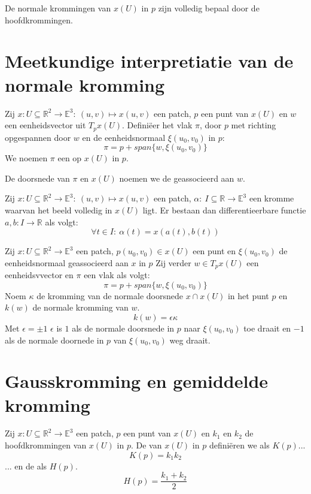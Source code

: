 \documentclass[main.tex]{subfiles}
\begin{document}
\begin{lem}
  De normale krommingen van $x(U)$ in $p$ zijn volledig bepaal door de hoofdkrommingen.
\end{lem}

\section{Meetkundige interpretiatie van de normale kromming}
\label{sec:meetk-interpr-van}

\begin{de}
  Zij $x: U \subseteq \mathbb{R}^{2} \rightarrow \mathbb{E}^{3}:\ (u,v) \mapsto x(u,v)$ een patch, $p$ een punt van $x(U)$ en $w$ een eenheidsvector uit $T_{p}x(U)$.
  Defini\"eer het vlak $\pi$, door $p$ met richting opgespannen door $w$ en de eenheidsnormaal $\xi(u_{0},v_{0})$ in $p$:
  \[ \pi = p + span\{ w, \xi(u_{0},v_{0})\} \]
  We noemen $\pi$ een  op $x(U)$ in $p$.
\end{de}

\begin{de}
  De doorsnede van $\pi$ en $x(U)$ noemen we de  geassocieerd aan $w$.
\end{de}

\begin{lem}
  Zij $x: U \subseteq \mathbb{R}^{2} \rightarrow \mathbb{E}^{3}:\ (u,v) \mapsto x(u,v)$ een patch, $\alpha:\ I \subseteq \mathbb{R} \rightarrow \mathbb{E}^{3}$ een kromme waarvan het beeld volledig in $x(U)$ ligt.
  Er bestaan dan differentieerbare functie $a,b: I \rightarrow \mathbb{R}$ als volgt:
  \[ \forall t\in I:\ \alpha(t) = x(a(t),b(t))\]
\end{lem}

\begin{st}
  Zij $x: U \subseteq \mathbb{R}^{2} \rightarrow \mathbb{E}^{3}$ een patch, $p(u_{0},v_{0})\in x(U)$ een punt en $\xi(u_{0},v_{0})$ de eenheidsnormaal geassocieerd aan $x$ in $p$
  Zij verder $w\in T_{p}x(U)$ een eenheidsvvector en $\pi$ een vlak als volgt:
  \[ \pi = p + span\{ w, \xi(u_{0},v_{0})\} \]
  Noem $\kappa$ de kromming van de normale doorsnede $x\cap x(U)$ in het punt $p$ en $k(w)$ de normale kromming van $w$.
  \[ k(w) = \epsilon \kappa \]
  Met $\epsilon = \pm 1$
  $\epsilon$ is $1$ als de normale doorsnede in $p$ naar $\xi(u_{0},v_{0})$ toe draait en $-1$ als de normale doornede in $p$ van $\xi(u_{0},v_{0})$ weg draait.
\end{st}

\section{Gausskromming en gemiddelde kromming}
\label{sec:gausskr-en-gemidd}

\begin{de}
  Zij $x: U \subseteq \mathbb{R}^{2} \rightarrow \mathbb{E}^{3}$ een patch, $p$ een punt van $x(U)$ en $k_{1}$ en $k_{2}$ de hoofdkrommingen van $x(U)$ in $p$.
  De  van $x(U)$ in $p$ defini\"eren we als $K(p)$...
  \[ K(p) = k_{1}k_{2} \]
  ... en de  als $H(p)$.
  \[ H(p) = \frac{k_{1}+k_{2}}{2} \]
\end{de}
\end{document}
